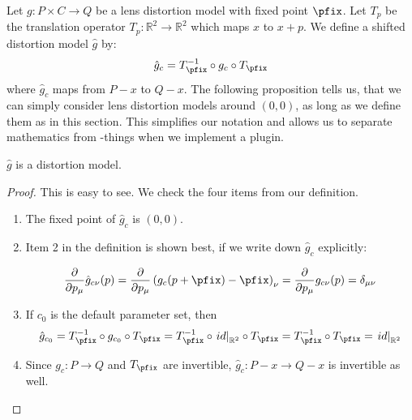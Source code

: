 \documentclass[10pt,a4paper]{article}
\newcommand{\Rpow}[1]{\mathbb{R}^{#1}}
\begin{document}
Let $g:P\times C \rightarrow Q$ be a lens distortion model with fixed point $\pfix$.
Let $T_p$ be the translation operator $T_p:\Rpow{2}\rightarrow\Rpow{2}$
which maps $x$ to $x+p$. We define a shifted distortion model $\hat{g}$ by:
\begin{equation}
\hat{g}_c = T_{\pfix}^{-1} \circ g_c \circ T_{\pfix}
\end{equation}
where $\hat{g}_c$ maps from $P-x$ to $Q-x$.
The following proposition tells us, that we can simply consider lens distortion models
around $(0,0)$, as long as we define them as in this section. This simplifies
our notation and allows us to separate mathematics from \tde-things when we implement a plugin.
\begin{prop}
\label{prop:ShiftedModel}
$\hat{g}$ is a distortion model.
\end{prop}
\begin{proof}
This is easy to see. We check the four items from our definition.
\begin{enumerate}
\item The fixed point of $\hat{g}_c$ is $(0,0)$.
\item Item 2 in the definition is shown best, if we write down $\hat{g}_c$ explicitly:

\begin{equation}
\frac \partial {\partial p_\mu} \hat{g}_{c\nu}(p) = \frac \partial {\partial p_\mu} \left(g_{c}(p + \pfix)-\pfix\right)_\nu = \frac \partial {\partial p_\mu} g_{c\nu}(p) = \delta_{\mu\nu}
\end{equation}

\item If $c_0$ is the default parameter set, then
\begin{equation}
\hat{g}_{c_0} = T_{\pfix}^{-1} \circ g_{c_0} \circ T_{\pfix} = T_{\pfix}^{-1} \circ \left.id\right|_{\Rpow{2}} \circ T_{\pfix} = T_{\pfix}^{-1} \circ T_{\pfix} = \left.id\right|_{\Rpow{2}}
\end{equation}
\item Since $g_c:P\rightarrow Q$ and $T_{\pfix}$ are invertible, $\hat{g}_c:P-x\rightarrow Q-x$ is invertible as well.
\end{enumerate}
\end{proof}
\end{document}
